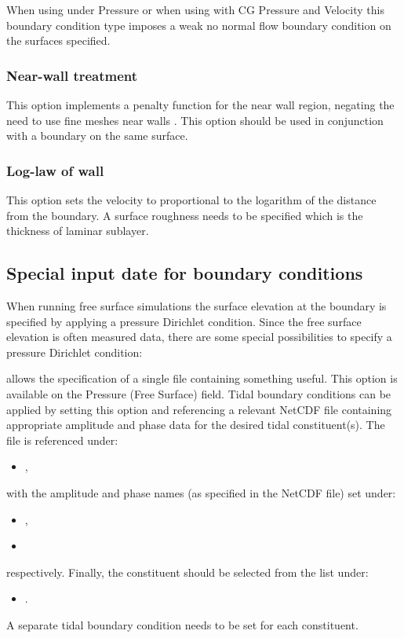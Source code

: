 When using  under Pressure  or when using 
 with CG Pressure and Velocity this boundary condition type 
imposes a weak no normal flow boundary condition on the surfaces specified.

\subsubsection{Near-wall treatment}

This option implements a penalty function for the near wall region, negating the need to use fine meshes
near walls \citet{bazilevs2007}. This option should be used in conjunction with a 
 boundary on the same surface.

\subsubsection{Log-law of wall}

This option sets the velocity to proportional to the logarithm of the distance from the boundary. 
A surface roughness needs to be specified which is the thickness of laminar sublayer.

\subsection{Special input date for boundary conditions}\label{Sect:BCs:specialised}

When running free surface simulations the surface elevation at the boundary is specified by applying a pressure Dirichlet condition. Since the free surface elevation is often measured data, there are some special possibilities to specify a pressure Dirichlet condition: 

 allows the specification of a single file
containing something useful. This option is available on the Pressure (Free
Surface) field. Tidal boundary conditions can be applied by setting this option
and referencing a relevant NetCDF file containing appropriate amplitude and phase data for the desired
tidal constituent(s). The file is referenced under:
\begin{itemize}
\item {},
\end{itemize}
with the amplitude and phase names (as specified in the NetCDF file) set under:
\begin{itemize}
\item {},
\item {}
\end{itemize}
respectively. Finally, the constituent should be selected from the list under:
\begin{itemize}
\item {}.
\end{itemize}
A separate tidal boundary condition needs to be set for each constituent.

